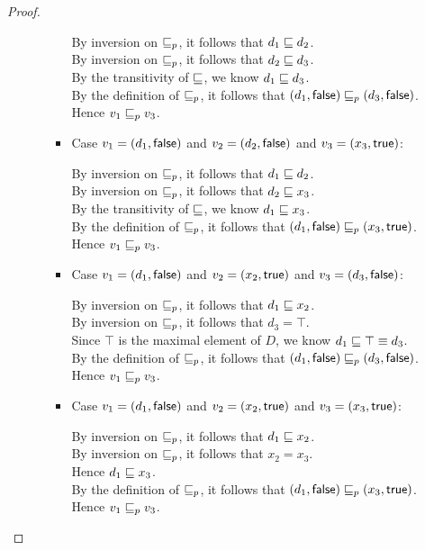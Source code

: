 \begin{proof}
\begin{enumerate}
\begin{enumerate}
\begin{itemize}
    By inversion on $\sqsubseteq_p$, it follows that $d_1 \sqsubseteq d_2$. \\ 
    By inversion on $\sqsubseteq_p$, it follows that $d_2 \sqsubseteq d_3$. \\ 
    By the transitivity of $\sqsubseteq$, we know $d_1 \sqsubseteq d_3$. \\ 
    By the definition of $\sqsubseteq_p$, it follows that $(d_1, \textsf{false}) \sqsubseteq_p (d_3, \textsf{false})$. \\ 
    Hence $v_1 \sqsubseteq_p v_3$. 

  \item Case $v_1 = (d_1, \textsf{false})$ and $v_2 = (d_2, \textsf{false})$ and $v_3 = (x_3, \textsf{true})$:

    By inversion on $\sqsubseteq_p$, it follows that $d_1 \sqsubseteq d_2$. \\ 
    By inversion on $\sqsubseteq_p$, it follows that $d_2 \sqsubseteq x_3$. \\ 
    By the transitivity of $\sqsubseteq$, we know $d_1 \sqsubseteq x_3$. \\ 
    By the definition of $\sqsubseteq_p$, it follows that $(d_1, \textsf{false}) \sqsubseteq_p (x_3, \textsf{true})$. \\ 
    Hence $v_1 \sqsubseteq_p v_3$. 

  \item Case $v_1 = (d_1, \textsf{false})$ and $v_2 = (x_2, \textsf{true})$ and $v_3 = (d_3, \textsf{false})$:

    By inversion on $\sqsubseteq_p$, it follows that $d_1 \sqsubseteq x_2$. \\ 
    By inversion on $\sqsubseteq_p$, it follows that $d_3 = \top$. \\ 
    Since $\top$ is the maximal element of $D$, we know $d_1 \sqsubseteq \top \equiv d_3$. \\ 
    By the definition of $\sqsubseteq_p$, it follows that $(d_1, \textsf{false}) \sqsubseteq_p (d_3, \textsf{false})$. \\ 
    Hence $v_1 \sqsubseteq_p v_3$. 

  \item Case $v_1 = (d_1, \textsf{false})$ and $v_2 = (x_2, \textsf{true})$ and $v_3 = (x_3, \textsf{true})$:

    By inversion on $\sqsubseteq_p$, it follows that $d_1 \sqsubseteq x_2$. \\ 
    By inversion on $\sqsubseteq_p$, it follows that $x_2 = x_3$. \\ 
    Hence $d_1 \sqsubseteq x_3$. \\ 
    By the definition of $\sqsubseteq_p$, it follows that $(d_1, \textsf{false}) \sqsubseteq_p (x_3, \textsf{true})$. \\ 
    Hence $v_1 \sqsubseteq_p v_3$. 


\end{itemize}
\end{enumerate}
\end{enumerate}
\end{proof}

